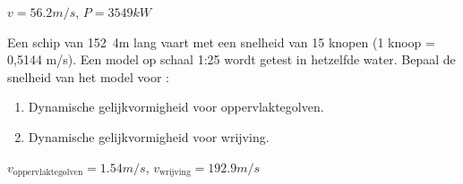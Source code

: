 	\begin{antwoord}
		$v = \unit{56.2}{m/s}$, $P = \unit{3549}{kW}$
	\end{antwoord}
	\begin{toepassing}
		\label{schip}
		Een schip van \unit{152.4}{m} lang vaart met een snelheid van 15 knopen (1 knoop = 0,5144 m/s). Een model op schaal 1:25 wordt getest in hetzelfde water.
		Bepaal de snelheid van het model voor :
		\begin{enumerate}
			\item Dynamische gelijkvormigheid voor oppervlaktegolven.
			\item Dynamische gelijkvormigheid voor wrijving.
		\end{enumerate}
	\end{toepassing}
	\begin{antwoord}
		$v_{\text{oppervlaktegolven}} = \unit{1.54}{m/s}$, $v_{\text{wrijving}} = \unit{192.9}{m/s}$
	\end{antwoord}
